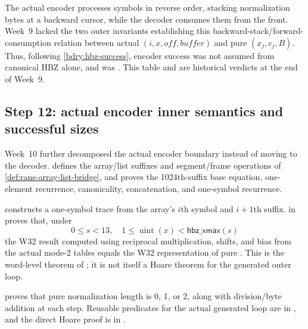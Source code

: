 The actual encoder processes symbols in reverse order, stacking normalization
bytes at a backward cursor, while the decoder consumes them from the front.
Week~9 lacked the two outer invariants establishing this backward-stack/forward-
consumption relation between actual \((i,x,off,buffer)\) and pure
\((x_j,c_j,B)\). Thus, following \cref{bdry:hbz-success}, encoder success was
not assumed from canonical HBZ alone, and
 was \statuspartial. This table and
 are historical verdicts at the end of Week~9.

\subsection{Step 12: actual encoder inner semantics and successful sizes}

Week~10 further decomposed the actual encoder boundary instead of moving to
the decoder. \allowbreak{}
defines the array/list suffixes and segment/frame operations of
\cref{def:rans-array-list-bridge}, and proves the 1024th-suffix base equation,
one-element recurrence, canonicality, concatenation, and one-symbol
 recurrence.

\begin{verified}
\label{thm:rans-array-word-bridge}
\allowbreak{} constructs
a one-symbol trace from the array's \(i\)th symbol and \(i+1\)th suffix.
\allowbreak{}
in \allowbreak{} proves that,
under
\[
  0\le s<13,\quad
  1\le\operatorname{uint}(x)<\mathsf{hbz\_xmax}(s)
\]
the W32 result computed using reciprocal multiplication, shifts, and bias from
the actual mode-2 tables equals the W32 representation of pure
. This is the word-level theorem of
; it is not itself a Hoare theorem for the
generated outer loop.
\end{verified}

 proves that pure normalization
length is 0, 1, or 2, along with division/byte addition at each step. Reusable
predicates for the actual generated loop are in
, and the direct Hoare proof is in
.


